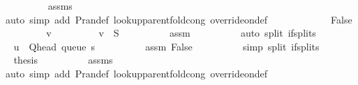 \begin{isabellebody}
\ \ \ \ \ \ \ \ \isamarkupfalse%
\ assms\isanewline
\ \ \ \ \ \ \ \ \isamarkupfalse%
\ {\isacharparenleft}{\kern0pt}auto\ simp\ add{\isacharcolon}{\kern0pt}\ P{\isachardot}{\kern0pt}ran{\isacharunderscore}{\kern0pt}def\ lookup{\isacharunderscore}{\kern0pt}parent{\isacharunderscore}{\kern0pt}fold{\isacharunderscore}{\kern0pt}cong{\isacharunderscore}{\kern0pt}{}\ override{\isacharunderscore}{\kern0pt}on{\isacharunderscore}{\kern0pt}def{\isacharparenright}{\kern0pt}\isanewline
\ \ \ \ \isamarkupfalse%
\isanewline
\ \ \ \ \ \ \isamarkupfalse%
\ False\isanewline
\ \ \ \ \ \ \isamarkupfalse%
\ \isamarkupfalse%
\ v\ \isanewline
\ \ \ \ \ \ \ \ {\isachardoublequoteopen}v\ {\isasymin}\ {\isacharquery}{\kern0pt}S{\isachardoublequoteclose}\isanewline
\ \ \ \ \ \ \ \ \isamarkupfalse%
\ assm\isanewline
\ \ \ \ \ \ \ \ \isamarkupfalse%
\ {\isacharparenleft}{\kern0pt}auto\ split{\isacharcolon}{\kern0pt}\ if{\isacharunderscore}{\kern0pt}splits{\isacharparenleft}{\kern0pt}{}{\isacharparenright}{\kern0pt}{\isacharparenright}{\kern0pt}\isanewline
\ \ \ \ \ \ \isamarkupfalse%
\ \isamarkupfalse%
\ {\isachardoublequoteopen}u\ {\isacharequal}{\kern0pt}\ Q{\isacharunderscore}{\kern0pt}head\ {\isacharparenleft}{\kern0pt}queue\ s{\isacharparenright}{\kern0pt}{\isachardoublequoteclose}\isanewline
\ \ \ \ \ \ \ \ \isamarkupfalse%
\ assm\ False\isanewline
\ \ \ \ \ \ \ \ \isamarkupfalse%
\ {\isacharparenleft}{\kern0pt}simp\ split{\isacharcolon}{\kern0pt}\ if{\isacharunderscore}{\kern0pt}splits{\isacharparenleft}{\kern0pt}{}{\isacharparenright}{\kern0pt}{\isacharparenright}{\kern0pt}\isanewline
\ \ \ \ \ \ \isamarkupfalse%
\ \isamarkupfalse%
\ {\isacharquery}{\kern0pt}thesis\isanewline
\ \ \ \ \ \ \ \ \isamarkupfalse%
\ assms\isanewline
\ \ \ \ \ \ \ \ \isamarkupfalse%
\ {\isacharparenleft}{\kern0pt}auto\ simp\ add{\isacharcolon}{\kern0pt}\ P{\isachardot}{\kern0pt}ran{\isacharunderscore}{\kern0pt}def\ lookup{\isacharunderscore}{\kern0pt}parent{\isacharunderscore}{\kern0pt}fold{\isacharunderscore}{\kern0pt}cong{\isacharunderscore}{\kern0pt}{}\ override{\isacharunderscore}{\kern0pt}on{\isacharunderscore}{\kern0pt}def{\isacharparenright}{\kern0pt}\isanewline
\ \ \ \ \isamarkupfalse%
\isanewline
\ \ \isamarkupfalse%

\end{isabellebody}
